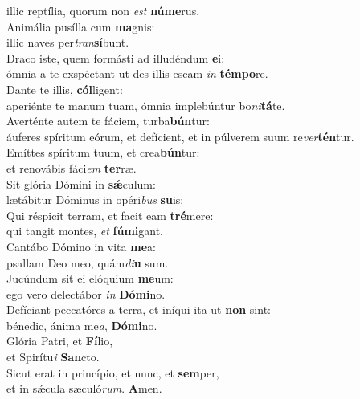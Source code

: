 \evenverse illic reptília, quorum non \textit{est} \textbf{nú}\textbf{me}rus.\\
\oddverse Animália pusílla cum \textbf{ma}gnis:~\*\\
\oddverse illic naves per\textit{tran}\textbf{sí}bunt.\\
\evenverse Draco iste, quem formásti ad illudéndum \textbf{e}i:~\*\\
\evenverse ómnia a te exspéctant ut des illis escam \textit{in} \textbf{tém}\textbf{po}re.\\
\oddverse Dante te illis, \textbf{cól}ligent:~\*\\
\oddverse aperiénte te manum tuam, ómnia implebúntur bo\textit{ni}\textbf{tá}te.\\
\evenverse Averténte autem te fáciem, turba\textbf{bún}tur:~\*\\
\evenverse áuferes spíritum eórum, et defícient, et in púlverem suum re\textit{ver}\textbf{tén}tur.\\
\oddverse Emíttes spíritum tuum, et crea\textbf{bún}tur:~\*\\
\oddverse et renovábis fáci\textit{em} \textbf{ter}ræ.\\
\evenverse Sit glória Dómini in \textbf{sǽ}culum:~\*\\
\evenverse lætábitur Dóminus in opéri\textit{bus} \textbf{su}is:\\
\oddverse Qui réspicit terram, et facit eam \textbf{tré}mere:~\*\\
\oddverse qui tangit montes, \textit{et} \textbf{fú}\textbf{mi}gant.\\
\evenverse Cantábo Dómino in vita \textbf{me}a:~\*\\
\evenverse psallam Deo meo, quám\textit{di}\textbf{u} sum.\\
\oddverse Jucúndum sit ei elóquium \textbf{me}um:~\*\\
\oddverse ego vero delectábor \textit{in} \textbf{Dó}\textbf{mi}no.\\
\evenverse Defíciant peccatóres a terra, et iníqui ita ut \textbf{non} sint:~\*\\
\evenverse bénedic, ánima me\textit{a}, \textbf{Dó}\textbf{mi}no.\\
\oddverse Glória Patri, et \textbf{Fí}lio,~\*\\
\oddverse et Spirítu\textit{i} \textbf{San}cto.\\
\evenverse Sicut erat in princípio, et nunc, et \textbf{sem}per,~\*\\
\evenverse et in sǽcula sæculó\textit{rum}. \textbf{A}men.\\
